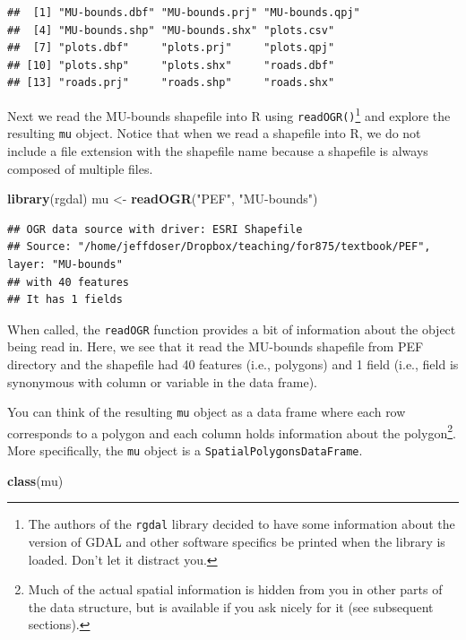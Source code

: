 \documentclass[
]{krantz}
\newenvironment{Shaded}{\begin{snugshade}}{\end{snugshade}}
\newcommand{\KeywordTok}[1]{\textcolor[rgb]{0.13,0.29,0.53}{\textbf{#1}}}
\newcommand{\NormalTok}[1]{#1}
\newcommand{\StringTok}[1]{\textcolor[rgb]{0.31,0.60,0.02}{#1}}
\begin{document}
\begin{verbatim}
##  [1] "MU-bounds.dbf" "MU-bounds.prj" "MU-bounds.qpj"
##  [4] "MU-bounds.shp" "MU-bounds.shx" "plots.csv"    
##  [7] "plots.dbf"     "plots.prj"     "plots.qpj"    
## [10] "plots.shp"     "plots.shx"     "roads.dbf"    
## [13] "roads.prj"     "roads.shp"     "roads.shx"
\end{verbatim}

Next we read the MU-bounds shapefile into R using \texttt{readOGR()}\footnote{The authors of the \texttt{rgdal} library decided to have some information about the version of GDAL and other software specifics be printed when the library is loaded. Don't let it distract you.} and explore the resulting \texttt{mu} object. Notice that when we read a shapefile into R, we do not include a file extension with the shapefile name because a shapefile is always composed of multiple files.

\begin{Shaded}
\begin{Highlighting}[]
\KeywordTok{library}\NormalTok{(rgdal)}
\NormalTok{mu \textless{}{-}}\StringTok{ }\KeywordTok{readOGR}\NormalTok{(}\StringTok{"PEF"}\NormalTok{, }\StringTok{"MU{-}bounds"}\NormalTok{)}
\end{Highlighting}
\end{Shaded}

\begin{verbatim}
## OGR data source with driver: ESRI Shapefile 
## Source: "/home/jeffdoser/Dropbox/teaching/for875/textbook/PEF", layer: "MU-bounds"
## with 40 features
## It has 1 fields
\end{verbatim}

When called, the \texttt{readOGR} function provides a bit of information about the object being read in. Here, we see that it read the MU-bounds shapefile from PEF directory and the shapefile had 40 features (i.e., polygons) and 1 field (i.e., field is synonymous with column or variable in the data frame).

You can think of the resulting \texttt{mu} object as a data frame where each row corresponds to a polygon and each column holds information about the polygon\footnote{Much of the actual spatial information is hidden from you in other parts of the data structure, but is available if you ask nicely for it (see subsequent sections).}. More specifically, the \texttt{mu} object is a \texttt{SpatialPolygonsDataFrame}.

\begin{Shaded}
\begin{Highlighting}[]
\KeywordTok{class}\NormalTok{(mu)}
\end{Highlighting}
\end{Shaded}
\end{document}
